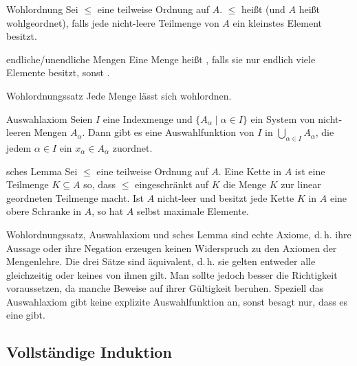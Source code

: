 \begin{Def}{Wohlordnung}
    Sei $\le$ eine teilweise Ordnung auf $A$.
    $\le$ heißt  (und $A$ heißt wohlgeordnet), falls jede
    nicht-leere Teilmenge von $A$ ein kleinstes Element besitzt.
\end{Def}

\begin{Def}{endliche/unendliche Mengen}
    Eine Menge heißt , falls sie nur endlich viele Elemente
    besitzt, sonst .
\end{Def}

\begin{Satz}{Wohlordnungssatz}
    Jede Menge lässt sich wohlordnen.
\end{Satz}

\begin{Satz}{Auswahlaxiom}
    Seien $I$ eine Indexmenge und $\{A_\alpha \;|\; \alpha \in I\}$ ein System
    von nicht-leeren Mengen $A_\alpha$.
    Dann gibt es eine Auswahlfunktion von $I$ in
    $\bigcup_{\alpha \in I} A_\alpha$, die jedem $\alpha \in I$ ein
    $x_\alpha \in A_\alpha$ zuordnet.
\end{Satz}

\begin{Satz}{sches Lemma}
    Sei $\le$ eine teilweise Ordnung auf $A$.
    Eine Kette in $A$ ist eine Teilmenge $K \subseteq A$ so, dass $\le$
    eingeschränkt auf $K$ die Menge $K$ zur linear geordneten Teilmenge macht.
    Ist $A$ nicht-leer und besitzt jede Kette $K$ in $A$ eine obere Schranke
    in $A$, so hat $A$ selbst maximale Elemente.
\end{Satz}

\begin{Bem}
    Wohlordnungssatz, Auswahlaxiom und sches Lemma sind echte
    Axiome, d.\,h. ihre Aussage oder ihre Negation erzeugen keinen Widerspruch
    zu den Axiomen der Mengenlehre.
    Die drei Sätze sind äquivalent, d.\,h. sie gelten entweder alle gleichzeitig
    oder keines von ihnen gilt.
    Man sollte jedoch besser die Richtigkeit voraussetzen, da manche Beweise
    auf ihrer Gültigkeit beruhen.
    Speziell das Auswahlaxiom gibt keine explizite Auswahlfunktion an, sonst
    besagt nur, dass es eine gibt.
\end{Bem}

\subsection{%
    Vollständige Induktion%
}

